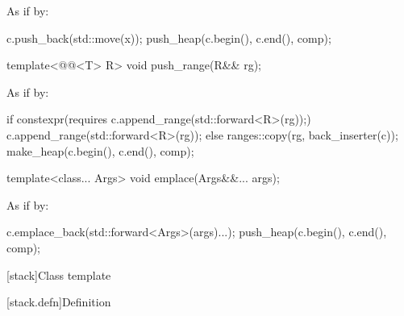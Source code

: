 \documentclass{wg21}
\begin{document}
\begin{itemdescr}
    \pnum
    \effects
    As if by:
    \begin{codeblock}
        c.push_back(std::move(x));
        push_heap(c.begin(), c.end(), comp);
    \end{codeblock}
\end{itemdescr}

\begin{addedblock}
%
\begin{itemdecl}
template<@@<T> R>
void push_range(R&& rg);
\end{itemdecl}
\begin{itemdescr}
    \pnum
    \effects
    As if by:
    \begin{codeblock}
        if constexpr(requires {c.append_range(std::forward<R>(rg));}) {
             c.append_range(std::forward<R>(rg));
        }
        else {
            ranges::copy(rg, back_inserter(c));
        }
        make_heap(c.begin(), c.end(), comp);
    \end{codeblock}
\end{itemdescr}
\end{addedblock}


%
\begin{itemdecl}
    template<class... Args> void emplace(Args&&... args);
\end{itemdecl}

\begin{itemdescr}
    \pnum
    \effects
    As if by:
    \begin{codeblock}
        c.emplace_back(std::forward<Args>(args)...);
        push_heap(c.begin(), c.end(), comp);
    \end{codeblock}
\end{itemdescr}

[stack]{Class template }

[stack.defn]{Definition}
\end{document}
